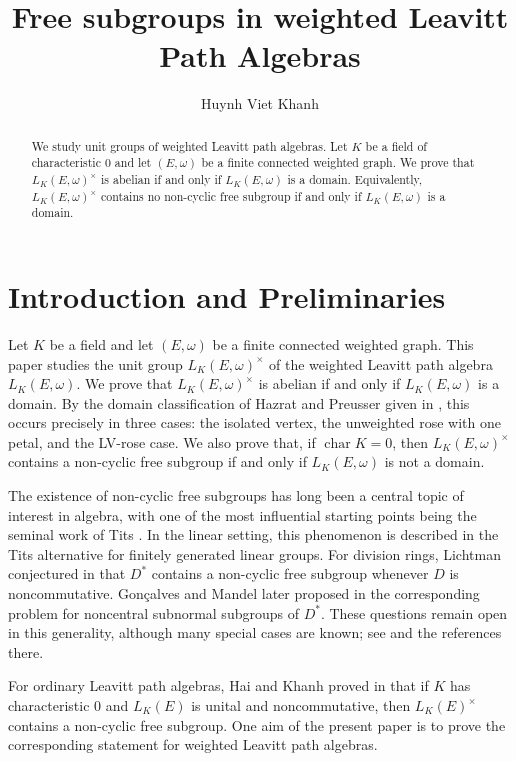 \documentclass{article}
\title{Free subgroups in weighted Leavitt Path Algebras}
\author{Huynh Viet Khanh}
\affil{Department of Mathematics and Informatics, HCMC University of Education, Ho Chi Minh City, Vietnam, \texttt{khanhhv@hcmue.edu.vn}}
\date{ }
\theoremstyle{definition}
\begin{document}
\maketitle

\begin{abstract}
We study unit groups of weighted Leavitt path algebras. Let $K$ be a field
of characteristic $0$ and let $(E,\omega)$ be a finite connected weighted
graph. We prove that $L_K(E,\omega)^\times$ is abelian if and only if
$L_K(E,\omega)$ is a domain. Equivalently, $L_K(E,\omega)^\times$ contains
no non-cyclic free subgroup if and only if $L_K(E,\omega)$ is a domain.
\end{abstract}

\section{Introduction and Preliminaries}\label{sec:intro}
Let $K$ be a field and let $(E,\omega)$ be a finite connected weighted graph. This paper studies the unit group $L_K(E,\omega)^\times$ of the weighted Leavitt path algebra $L_K(E,\omega)$. We prove that $L_K(E,\omega)^\times$ is abelian if and only if $L_K(E,\omega)$ is a domain. By the domain classification of Hazrat and Preusser given in \cite{HaP}, this occurs precisely in three cases: the isolated vertex, the unweighted rose with one petal, and the LV-rose case. We also prove that, if $\operatorname{char}K=0$, then $L_K(E,\omega)^\times$ contains a non-cyclic free subgroup if and only if $L_K(E,\omega)$ is not a domain.

The existence of non-cyclic free subgroups has long been a central topic of interest in algebra, with one of the most influential starting points being the seminal work of Tits \cite{T}. In the linear setting, this phenomenon is described in the Tits alternative for finitely generated linear groups.
For division rings, Lichtman conjectured in \cite{L} that $D^*$ contains a non-cyclic free subgroup whenever $D$ is noncommutative. Gon\c{c}alves and Mandel later proposed in \cite{GM} the corresponding problem for noncentral subnormal subgroups of $D^*$. These questions remain open in this generality, although many special cases are known; see \cite{HK} and the references there.

For ordinary Leavitt path algebras, Hai and Khanh proved in \cite{HK} that if $K$ has characteristic $0$ and $L_K(E)$ is unital and noncommutative, then $L_K(E)^\times$ contains a non-cyclic free subgroup. One aim of the present paper is to prove the corresponding statement for weighted Leavitt path algebras.
\end{document}
